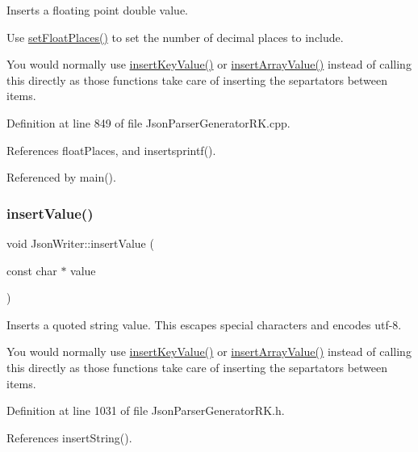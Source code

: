 Inserts a floating point double value. 

Use \hyperlink{class_json_writer_aecd4d984a49fe59b0c4d892fe6d1e791}{set\+Float\+Places()} to set the number of decimal places to include.

You would normally use \hyperlink{class_json_writer_ac2de627389b59ce2c8ed95e10ea213bf}{insert\+Key\+Value()} or \hyperlink{class_json_writer_a8b4dc6726b66b4f277c7674e60c8a057}{insert\+Array\+Value()} instead of calling this directly as those functions take care of inserting the separtators between items. 

Definition at line 849 of file Json\+Parser\+Generator\+R\+K.\+cpp.



References float\+Places, and insertsprintf().



Referenced by main().

\mbox{\label{class_json_writer_aeac7ad2b336bb15c05a6094a59a42126}} 
\subsubsection{\texorpdfstring{insert\+Value()}{insertValue()}\hspace{0.1cm}{\footnotesize\ttfamily [8/9]}}
{\footnotesize\ttfamily void Json\+Writer\+::insert\+Value (\begin{DoxyParamCaption}\item[{const char $\ast$}]{value }\end{DoxyParamCaption})\hspace{0.3cm}{\ttfamily [inline]}}



Inserts a quoted string value. This escapes special characters and encodes utf-\/8. 

You would normally use \hyperlink{class_json_writer_ac2de627389b59ce2c8ed95e10ea213bf}{insert\+Key\+Value()} or \hyperlink{class_json_writer_a8b4dc6726b66b4f277c7674e60c8a057}{insert\+Array\+Value()} instead of calling this directly as those functions take care of inserting the separtators between items. 

Definition at line 1031 of file Json\+Parser\+Generator\+R\+K.\+h.



References insert\+String().



